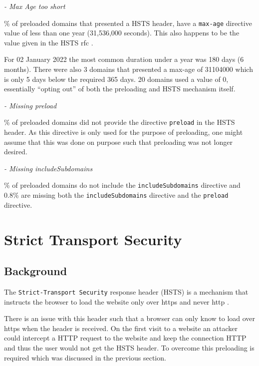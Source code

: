 \documentclass{mscreport}
\begin{document}
\vspace{0.3cm} \noindent
\textit{- Max Age too short}

\vspace{0.3cm} \% of preloaded domains that presented a HSTS header, have a \texttt{max-age} directive value of less than one year (31,536,000 seconds). This also happens to be the value given in the HSTS rfc \cite{Hodges2012-pe}.

\vspace{0.3cm} \noindent
For 02 January 2022 the most common duration under a year was 180 days (6 months). There were also 3 domains that presented a max-age of 31104000 which is only 5 days below the required 365 days. 20 domains used a value of 0, essentially ``opting out'' of both the preloading and HSTS mechanism itself.

\vspace{0.3cm} \noindent
\textit{- Missing preload}

\vspace{0.3cm} \% of preloaded domains did not provide the directive \texttt{preload} in the HSTS header. As this directive is only used for the purpose of preloading, one might assume that this was done on purpose such that preloading was not longer desired.

\vspace{0.3cm} \noindent
\textit{- Missing includeSubdomains}

\vspace{0.3cm} \% of preloaded domains do not include the \texttt{includeSubdomains} directive and 0.8\% are missing both the \texttt{includeSubdomains} directive and the \texttt{preload} directive.


\clearpage
\newpage

\section{Strict Transport Security}
\label{section:hsts}

\subsection{Background}

The \texttt{Strict-Transport Security} response header (HSTS) is a mechanism that instructs the browser to load the website only over https and never http \cite{Hodges2012-pe}.

\vspace{0.3cm} \noindent
There is an issue with this header such that a browser can only know to load over https when the header is received. On the first visit to a website an attacker could intercept a HTTP request to the website and keep the connection HTTP and thus the user would not get the HSTS header. To overcome this preloading is required which was discussed in the previous section.
\end{document}
